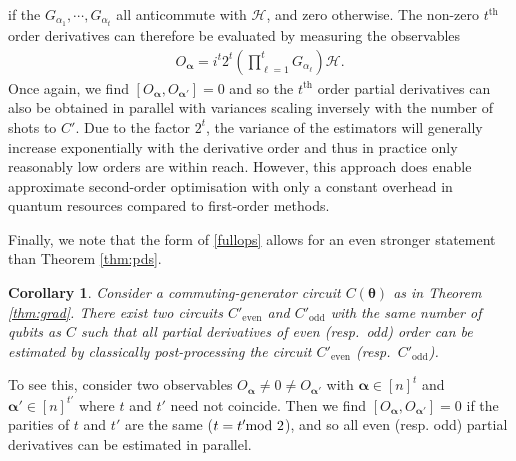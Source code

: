 \documentclass[a4paper,twocolumn,11pt,accepted=2025-09-06]{quantumarticle}
\newtheorem{corollary}{Corollary}
\renewcommand{\vec}{\boldsymbol}
\newcommand{\nospacemod}{\hspace{-7pt}\mod}
\begin{document}
%
if the $G_{\alpha_1},\cdots,G_{\alpha_t}$ all anticommute with $\mathcal{H}$, and zero otherwise. The non-zero $t^{\text{th}}$ order derivatives can therefore be evaluated by measuring the observables 
\begin{align}\label{fullops}
O_{\vec{\alpha}}=i^{t}2^t\left(\prod_{\ell=1}^t G_{\alpha_\ell}\right)\mathcal{H}.
\end{align} 
%
Once again, we find $[O_{\vec{\alpha}},O_{\vec{\alpha}'}]=0$ and so the $t^{\text{th}}$ order partial derivatives can also be obtained in parallel with variances scaling inversely with the number of shots to $C'$. Due to the factor $2^t$, the variance of the estimators will generally increase exponentially with the derivative order and thus in practice only reasonably low orders are within reach. However, this approach does enable approximate second-order optimisation with only a constant overhead in quantum resources compared to first-order methods.

Finally, we note that the form of \eqref{fullops} allows for an even stronger statement than Theorem \ref{thm:pds}.
%
\begin{corollary}
Consider a commuting-generator circuit $C(\vec{\theta})$ as in Theorem \ref{thm:grad}. There exist two circuits ${C}'_{\text{even}}$ and ${C}'_\text{odd}$ with the same number of qubits as $C$ such that all partial derivatives of even (resp.\ odd) order can be estimated by classically post-processing the circuit ${C}'_{\text{even}}$ (resp.\ ${C}'_{\text{odd}}$).
\end{corollary}
%
To see this, consider two observables $O_{\vec{\alpha}}\neq 0\neq O_{\vec{\alpha}'}$ with $\vec{\alpha}\in[n]^t$ and $\vec{\alpha}'\in[n]^{t'}$ where $t$ and $t'$ need not coincide.
Then we find $[O_{\vec{\alpha}},O_{\vec{\alpha}'}]=0$ if the parities of $t$ and $t'$ are the same ($t=t' \nospacemod 2$), and so all even (resp. odd) partial derivatives can be estimated in parallel.
\end{document}
